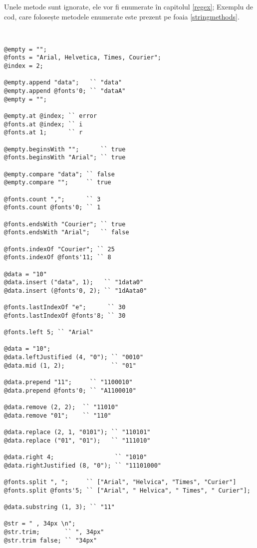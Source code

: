 Unele metode sunt ignorate, ele vor fi enumerate în capitolul \ref{regex}; Exemplu de cod, care folosește metodele enumerate este prezent pe foaia \ref{stringmethods}.

\

\begin{sourcecode}
\label{stringmethods}
\begin{verbatim}
@empty = "";
@fonts = "Arial, Helvetica, Times, Courier";
@index = 2;

@empty.append "data";   `` "data"
@empty.append @fonts'0; `` "dataA"
@empty = "";

@empty.at @index; `` error
@fonts.at @index; `` i
@fonts.at 1;	  `` r

@empty.beginsWith "";      `` true
@fonts.beginsWith "Arial"; `` true

@empty.compare "data"; `` false
@empty.compare "";     `` true

@fonts.count ",";      `` 3
@fonts.count @fonts'0; `` 1

@fonts.endsWith "Courier"; `` true
@fonts.endsWith "Arial";   `` false

@fonts.indexOf "Courier"; `` 25
@fonts.indexOf @fonts'11; `` 8

@data = "10"
@data.insert ("data", 1);   `` "1data0"
@data.insert (@fonts'0, 2); `` "1dAata0"

@fonts.lastIndexOf "e";      `` 30
@fonts.lastIndexOf @fonts'8; `` 30

@fonts.left 5; `` "Arial"

@data = "10";
@data.leftJustified (4, "0"); `` "0010"
@data.mid (1, 2);             `` "01"

@data.prepend "11";     `` "1100010"
@data.prepend @fonts'0; `` "A1100010"

@data.remove (2, 2);  `` "11010"
@data.remove "01";    `` "110"

@data.replace (2, 1, "0101"); `` "110101"
@data.replace ("01", "01");   `` "111010"

@data.right 4; 				   `` "1010"
@data.rightJustified (8, "0"); `` "11101000"

@fonts.split ", ";     `` ["Arial", "Helvica", "Times", "Curier"]
@fonts.split @fonts'5; `` ["Arial", " Helvica", " Times", " Curier"];

@data.substring (1, 3); `` "11"

@str = " , 34px \n";
@str.trim;       `` ", 34px"
@str.trim false; `` "34px"
\end{verbatim}
\end{sourcecode}


